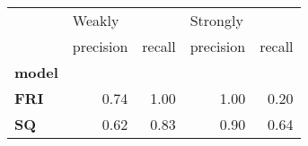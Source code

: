 \begin{tabular}{lrrrr}
\toprule
{} & \multicolumn{2}{l}{Weakly} & \multicolumn{2}{l}{Strongly} \\
{} & precision & recall & precision & recall \\
\textbf{model} &           &        &           &        \\
\midrule
\textbf{FRI  } &      0.74 &   1.00 &      1.00 &   0.20 \\
\textbf{SQ   } &      0.62 &   0.83 &      0.90 &   0.64 \\
\bottomrule
\end{tabular}

